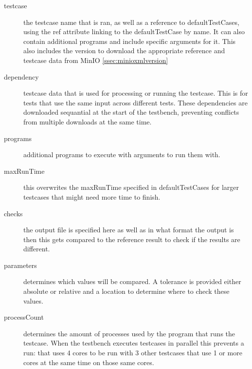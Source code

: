 \documentclass{deltares_memo}
\begin{document}
\begin{description}
\item[testcase] the testcase name that is ran, as well as a reference to defaultTestCases, using the ref attribute linking to the defaultTestCase by name. It can also contain additional programs and include specific arguments for it. This also includes the version to download the appropriate reference and testcase data from MinIO \autoref{ssec:minioxmlversion}
\item[dependency] testcase data that is used for processing or running the testcase. This is for tests that use the same input across different tests. These dependencies are downloaded sequantial at the start of the testbench, preventing conflicts from multiple downloads at the same time.
\item[programs] additional programs to execute with arguments to run them with.
\item[maxRunTime] this overwrites the maxRunTime specified in defaultTestCases for larger testcases that might need more time to finish.
\item[checks] the output file is specified here as well as in what format the output is then this gets compared to the reference result to check if the results are different.
\item[parameters] determines which values will be compared. A tolerance is provided either absolute or relative and a location to determine where to check these values.
\item[processCount] determines the amount of processes used by the program that runs the testcase. When the testbench executes testcases in parallel this prevents a run: that uses 4 cores to be run with 3 other testcases that use 1 or more cores at the same time on those same cores.
\end{description}
\end{document}
